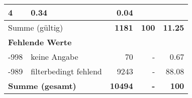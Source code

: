 \begin{longtable}{lXrrr}
       \num{4} &
       \num[round-mode=places,round-precision=2]{0,34} &
         \num[round-mode=places,round-precision=2]{0,04} \\
     \midrule
     \multicolumn{2}{l}{Summe (gültig)} &
       \textbf{\num{1181}} &
     \textbf{100} &
       \textbf{\num[round-mode=places,round-precision=2]{11,25}} \\
     \multicolumn{5}{l}{\textbf{Fehlende Werte}}\\
       -998 &
       keine Angabe &
         \num{70} &
        - &
         \num[round-mode=places,round-precision=2]{0,67} \\
       -989 &
       filterbedingt fehlend &
         \num{9243} &
        - &
         \num[round-mode=places,round-precision=2]{88,08} \\
     \midrule
     \multicolumn{2}{l}{\textbf{Summe (gesamt)}} &
          \textbf{\num{10494}} &
        \textbf{-} &
        \textbf{100} \\
     \bottomrule
     \end{longtable}
     
